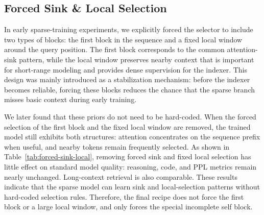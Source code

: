 \documentclass{llmxive}
\begin{document}
\subsection{Forced Sink \& Local Selection}
\label{app:prelim-sink-local}

In early sparse-training experiments, we explicitly forced the selector to include two types of blocks: the first block in the sequence and a fixed local window around the query position. The first block corresponds to the common attention-sink pattern, while the local window preserves nearby context that is important for short-range modeling and provides dense supervision for the indexer. This design was mainly introduced as a stabilization mechanism: before the indexer becomes reliable, forcing these blocks reduces the chance that the sparse branch misses basic context during early training.

We later found that these priors do not need to be hard-coded. When the forced selection of the first block and the fixed local window are removed, the trained model still exhibits both structures: attention concentrates on the sequence prefix when useful, and nearby tokens remain frequently selected.
As shown in Table~\ref{tab:forced-sink-local}, removing forced sink and fixed local selection has little effect on standard model quality: reasoning, code, and PPL metrics remain nearly unchanged. Long-context retrieval is also comparable.
These results indicate that the sparse model can learn sink and local-selection patterns without hard-coded selection rules. Therefore, the final recipe does not force the first block or a large local window, and only forces the special incomplete self block.
\end{document}

